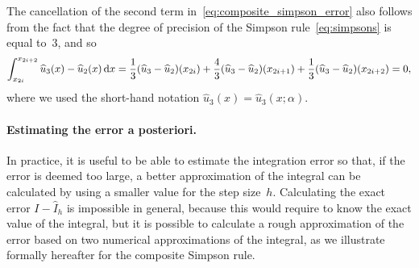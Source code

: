\begin{remark}
The cancellation of the second term in~\eqref{eq:composite_simpson_error} also follows from the fact that
the degree of precision of the Simpson rule~\eqref{eq:simpsons} is equal to~3,
and so
\[
    \int_{x_{2i}}^{x_{2i+2}} \widehat u_3(x) - \widehat u_2(x)  \, \mathrm d x = \frac{1}{3} (\widehat u_3 - \widehat u_2)(x_{2i}) + \frac{4}{3} (\widehat u_3 - \widehat u_2)(x_{2i+1}) + \frac{1}{3} (\widehat u_3 - \widehat u_2)(x_{2i+2}) = 0,
\]
where we used the short-hand notation $\widehat u_3(x) = \widehat u_3(x; \alpha)$.
\end{remark}

\paragraph{Estimating the error a posteriori.}
In practice,
it is useful to be able to estimate the integration error so that,
if the error is deemed too large,
a better approximation of the integral can be calculated by using a smaller value for the step size~$h$.
Calculating the exact error $I - \widehat I_h$ is impossible in general,
because this would require to know the exact value of the integral,
but it is possible to calculate a rough approximation of the error based on two numerical approximations of the integral,
as we illustrate formally hereafter for the composite Simpson rule.

